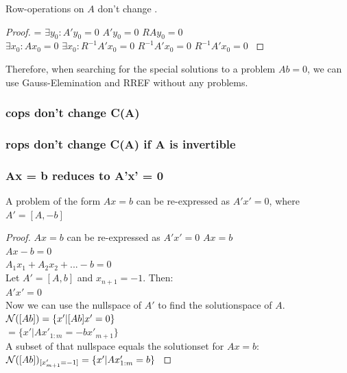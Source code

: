 \begin{theorem}
  Row-operations on $A$ don't change . 
\end{theorem}

\begin{proof}
     { = } {
         {$\exists y_0: A'y_0 = 0$} {
             {$A'y_0 = 0$} {
                $RAy_0 = 0$
            }
        } \\
         {$\exists x_0: Ax_0 = 0$} {
            \subprf {} {$\exists x_0: R^{-1} A' x_0 = 0$} {
                 {$R^{-1} A' x_0 = 0$} {
                    $R^{-1} A' x_0 = 0$
                }
            }
        }
    } 
\end{proof}

Therefore, when searching for the special solutions to a problem $Ab = 0$, we can use Gauss-Elemination and RREF without any problems.

\subsubsection {cops don't change C(A)}

\subsubsection {rops don't change C(A) if A is invertible }

\subsubsection {Ax = b reduces to A'x' = 0}

\begin{theorem}
  A problem of the form $Ax = b$ can be re-expressed as $A'x' = 0$, where $A' = [A, -b]$ 
\end{theorem}

\begin{proof}
    \subprf {} {$A x = b$ can be re-expressed as $A'x' = 0$} {
        $ A x = b $ \\
        $ A x -b = 0 $ \\
        $ A_1 x_1 + A_2 x_2 + ... -b = 0 $ \\
        Let $A' = [A, b]$ and $x_{n+1} = -1$. Then: \\
        $ A' x' = 0 $ \\
        Now we can use the nullspace of $A'$ to find the solutionspace of $A$. \\
        $ \mathcal{N}([A b]) = \{x' | [A b]x' = 0\} $ \\
        $ = \{x' | A x'_{1:m} = -b x'_{m+1}\} $ \\
        A subset of that nullspace equals the solutionset for $A x = b$: \\
        $ \mathcal{N}([A b])_{[x'_{m+1} = -1]} = \{x'| A x'_{1:m} = b \} $ 
    }   
\end{proof}


